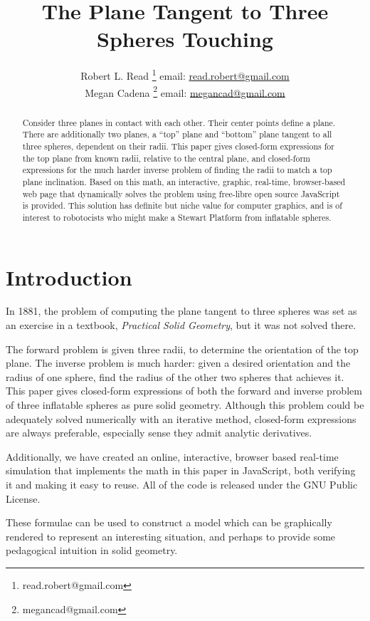 \documentclass{article}
\title{The Plane Tangent to Three Spheres Touching}
\author{Robert L. Read
  \thanks{read.robert@gmail.com}
  email: \href{mailto:read.robert@gmail.com}{read.robert@gmail.com}\\
Megan Cadena
  \thanks{megancad@gmail.com}
  email: \href{mailto:megancad@gmail.com}{megancad@gmail.com}
  }
\begin{document}
\maketitle

\begin{abstract}
  Consider three planes in contact with each other. Their center points
  define a plane. There are additionally two planes, a ``top'' plane and ``bottom'' plane
  tangent to all three spheres, dependent on their radii.
  This paper gives closed-form expressions for the top plane from known radii,
  relative to the central plane,
  and closed-form expressions for
  the much harder inverse problem of finding the radii to match a top plane inclination.
  Based on this math, an interactive, graphic, real-time,
  browser-based web page that dynamically solves the problem\cite{softrobotcalc}
  using free-libre open source JavaScript is provided.
  This solution has definite but niche value for computer graphics, and is of interest
  to robotocists who might make a Stewart Platform from inflatable spheres.
\end{abstract}


\section{Introduction}

In 1881, the problem of computing the plane tangent to three spheres was
set as an exercise in a textbook, {\em Practical Solid Geometry}\cite{payne1881},
but it was not solved there.

The forward problem is given three radii,
to determine the orientation of the top plane.
The inverse problem is much harder: given a desired orientation and the radius of one
sphere, find the radius of the other two spheres that achieves it.
This paper gives closed-form expressions of both
the forward and inverse problem of three inflatable spheres as pure solid geometry.
Although this problem could be adequately solved numerically with an iterative method,
closed-form expressions are always preferable, especially sense they admit analytic derivatives.

Additionally, we have created an online, interactive, browser based real-time simulation\cite{softrobotcalc} that implements
the math in this paper in JavaScript, both verifying it and making it easy to reuse.
All of the code is released under the GNU Public License\cite{AGPL3}.


These formulae can be used to construct a model which can be graphically rendered to represent an interesting
situation, and perhaps to provide some pedagogical intuition in solid geometry.
\end{document}
